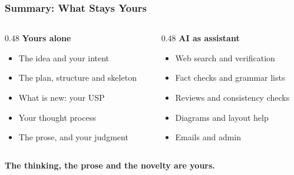 \begin{frame}[fragile]\frametitle{Summary: What Stays Yours}
\begin{columns}
    \begin{column}[T]{0.48\linewidth}
    \textbf{Yours alone}
    \begin{itemize}
    \item The idea and your intent
    \item The plan, structure and skeleton
    \item What is new: your USP
    \item Your thought process
    \item The prose, and your judgment
    \end{itemize}
    \end{column}
    \begin{column}[T]{0.48\linewidth}
    \textbf{AI as assistant}
    \begin{itemize}
    \item Web search and verification
    \item Fact checks and grammar lists
    \item Reviews and consistency checks
    \item Diagrams and layout help
    \item Emails and admin
    \end{itemize}
    \end{column}
\end{columns}
\medskip
\begin{center}
\textbf{The thinking, the prose and the novelty are yours.}
\end{center}
\end{frame}

